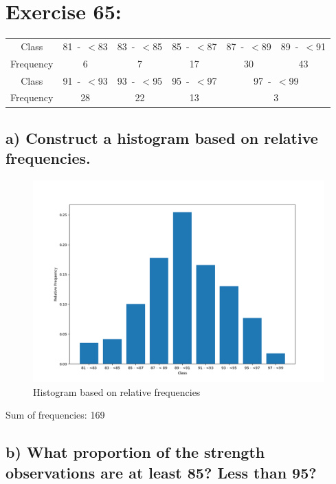 \newpage
\section{Exercise 65:}
\begin{table}[h!]
    \centering
    \begin{tabular}{cccccc}
         Class&  81~-~\(<\)83&  83~-~\(<\)85&  85~-~\(<\)87&  87~-~\(<\)89&89~-~\(<\)91\\
         Frequency&  6&  7&  17&  30&43\\ \hline
         Class&  91~-~\(<\)93&  93~-~\(<\)95&  95~-~\(<\)97&  \multicolumn{2}{c}{97~-~\(<\)99}\\
         Frequency&  28&  22&  13&  \multicolumn{2}{c}{3}\\
    \end{tabular}
\end{table}


\subsection{a) Construct a histogram based on relative frequencies.}
\begin{figure}[h!]
    \centering
    \includegraphics[scale=0.5]{"img/hw1-2a.png"}
    \caption{Histogram based on relative frequencies}
    \label{fig:65a}
\end{figure}

Sum of frequencies: 169
\subsection{b) What proportion of the strength observations are at 
least 85? Less than 95?}

